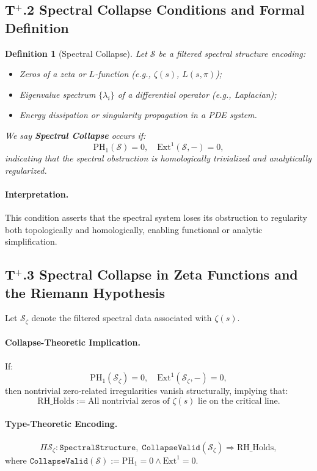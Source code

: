 \documentclass[11pt]{article}
\newtheorem{definition}[theorem]{Definition}
\begin{document}
\subsection*{T$^{+}$.2 Spectral Collapse Conditions and Formal Definition}

\begin{definition}[Spectral Collapse]
Let $\mathcal{S}$ be a filtered spectral structure encoding:
\begin{itemize}
    \item Zeros of a zeta or $L$-function (e.g., $\zeta(s)$, $L(s, \pi)$);
    \item Eigenvalue spectrum $\{ \lambda_i \}$ of a differential operator (e.g., Laplacian);
    \item Energy dissipation or singularity propagation in a PDE system.
\end{itemize}
We say \textbf{Spectral Collapse} occurs if:
\[
\mathrm{PH}_1(\mathcal{S}) = 0, \quad \mathrm{Ext}^1(\mathcal{S}, -) = 0,
\]
indicating that the spectral obstruction is homologically trivialized and analytically regularized.
\end{definition}

\paragraph{Interpretation.} This condition asserts that the spectral system loses its obstruction to regularity both topologically and homologically, enabling functional or analytic simplification.

\subsection*{T$^{+}$.3 Spectral Collapse in Zeta Functions and the Riemann Hypothesis}

Let $\mathcal{S}_{\zeta}$ denote the filtered spectral data associated with $\zeta(s)$.

\paragraph{Collapse-Theoretic Implication.} If:
\[
\mathrm{PH}_1(\mathcal{S}_{\zeta}) = 0, \quad \mathrm{Ext}^1(\mathcal{S}_{\zeta}, -) = 0,
\]
then nontrivial zero-related irregularities vanish structurally, implying that:
\[
\mathrm{RH\_Holds} := \text{All nontrivial zeros of } \zeta(s) \text{ lie on the critical line}.
\]

\paragraph{Type-Theoretic Encoding.}
\[
\Pi \mathcal{S}_{\zeta} : \texttt{SpectralStructure},\;
\texttt{CollapseValid}(\mathcal{S}_{\zeta})
\Rightarrow
\mathrm{RH\_Holds},
\]
where $\texttt{CollapseValid}(\mathcal{S}) := \mathrm{PH}_1 = 0 \wedge \mathrm{Ext}^1 = 0$.
\end{document}
